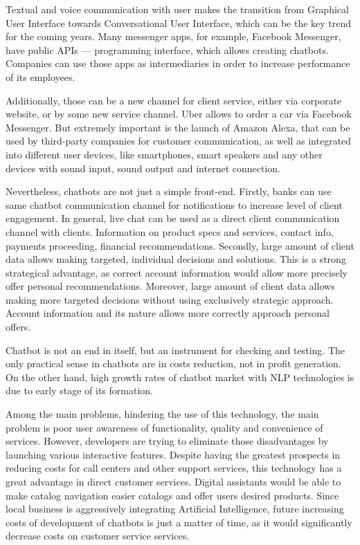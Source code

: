 Textual and voice communication with user makes the transition from Graphical User Interface towards Conversational User Interface, which can be the key trend for the coming years.
Many messenger apps, for example, Facebook Messenger, have public APIs — programming interface, which allows creating chatbots.
Companies can use those apps as intermediaries in order to increase performance of its employees.

Additionally, those can be a new channel for client service, either via corporate website, or by some new service channel.
Uber allows to order a car via Facebook Messenger.
But extremely important is the launch of Amazon Alexa, that can be used by third-party companies for customer communication, as well as integrated into different user devices, like smartphones, smart speakers and any other devices with sound input, sound output and internet connection.

Nevertheless, chatbots are not just a simple front-end.
Firstly, banks can use same chatbot communication channel for notifications to increase level of client engagement.
In general, live chat can be used as a direct client communication channel with clients.
Information on product specs and services, contact info, payments proceeding, financial recommendations.
Secondly, large amount of client data allows making targeted, individual decisions and solutions.
This is a strong strategical advantage, as correct account information would allow more precisely offer personal recommendations.
Moreover, large amount of client data allows making more targeted decisions without using exclusively strategic approach. 
Account information and its nature allows more correctly approach personal offers.

Chatbot is not an end in itself, but an instrument for checking and testing.
The only practical sense in chatbots are in costs reduction, not in profit generation.
On the other hand, high growth rates of chatbot market with NLP technologies is due to early stage of its formation.

Among the main problems, hindering the use of this technology, the main problem is poor user awareness of functionality, quality and convenience of services.
However, developers are trying to eliminate those disadvantages by launching various interactive features.
Despite having the greatest prospects in reducing costs for call centers and other support services, this technology has a great advantage in direct customer services.
Digital assistants would be able to make catalog navigation easier catalogs and offer users desired products.
Since local business is aggressively integrating Artificial Intelligence, future increasing costs of development of chatbots is just a matter of time,
as it would significantly decrease costs on customer service services.

